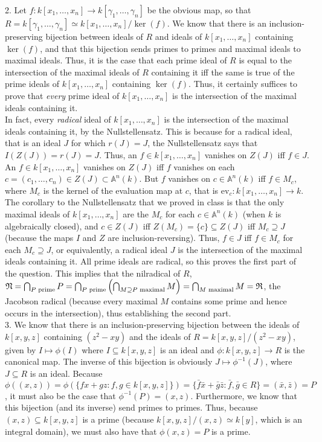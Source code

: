 \documentclass[11pt]{article}
\begin{document}
\num{2.} Let $f:k[x_1,\ldots,x_n]\rightarrow k[\gamma_1,\ldots,\gamma_n]$
be the obvious map, so that $R=k[\gamma_1,\ldots,\gamma_n]\simeq
k[x_1,\ldots,x_n]/\ker(f)$. We know that there is an inclusion-preserving
bijection between ideals of $R$ and ideals of $k[x_1,\ldots,x_n]$ containing
$\ker(f)$, and that this bijection sends primes to primes and maximal
ideals to maximal ideals. Thus, it is the case that each prime ideal of $R$
is equal to the intersection of the maximal ideals of $R$ containing it
iff the same is true of the prime ideals of $k[x_1,\ldots,x_n]$ containing
$\ker(f)$. Thus, it certainly suffices to prove that \textit{every} prime
ideal of $k[x_1,\ldots,x_n]$ is the intersection of the maximal ideals
containing it.\\

In fact, every \textit{radical} ideal of $k[x_1,\ldots,x_n]$
is the intersection of the maximal ideals containing it, by the
Nullstellensatz. This is because for a radical ideal, that is an ideal $J$ for
which $r(J)=J$, the Nullstellensatz says that $I(Z(J))=r(J)=J$. Thus, an $f\in
k[x_1,\ldots,x_n]$ vanishes on $Z(J)$ iff $f\in J$. An $f\in k[x_1,\ldots,x_n]$
vanishes on $Z(J)$ iff $f$ vanishes on each $c=(c_1,\ldots,c_n)\in
Z(J)\subset\mathbb{A}^n(k)$. But $f$ vanishes on $c\in\mathbb{A}^n(k)$
iff $f\in M_c$, where $M_c$ is the kernel of the evaluation map at $c$,
that is $\text{ev}_c:k[x_1,\ldots,x_n]\rightarrow k$. The corollary to the
Nullstellensatz that we proved in class is that the only maximal ideals of
$k[x_1,\ldots,x_n]$ are the $M_c$ for each $c\in\mathbb{A}^n(k)$ (when $k$
is algebraically closed), and $c\in Z(J)$ iff $Z(M_c)=\{c\}\subseteq Z(J)$ iff
$M_c\supseteq J$ (because the maps $I$ and $Z$ are inclusion-reversing). Thus,
$f\in J$ iff $f\in M_c$ for each $M_c\supseteq J$, or equivalently, a radical
ideal $J$ is the intersection of the maximal ideals containing it. All prime
ideals are radical, so this proves the first part of the question. This
implies that the nilradical of $R$, $\frak{N}=\bigcap_{P\text{ prime}}
P=\bigcap_{P\text{ prime}}\left(\bigcap_{M\supseteq P\text{ maximal}}
M\right)= \bigcap_{M\text{ maximal}} M=\frak{R}$, the Jacobson radical
(because every maximal $M$ contains some prime and hence occurs in the
intersection), thus establishing the second part.\\

\num{3.} We know that there is an inclusion-preserving bijection
between the ideals of $k[x,y,z]$ containing $(z^2-xy)$ and the ideals
of $R=k[x,y,z]/(z^2-xy)$, given by $I\mapsto \phi(I)$ where $I\subseteq
k[x,y,z]$ is an ideal and $\phi:k[x,y,z]\rightarrow R$ is the canonical
map. The inverse of this bijection is obviously $J\mapsto\phi^{-1}(J)$,
where $J\subseteq R$ is an ideal. Because $\phi((x,z))=\phi(\{fx+gz:f,g\in
k[x,y,z]\})=\{\bar{f}\bar{x}+\bar{g}\bar{z}:\bar{f},\bar{g}\in
R\}=(\bar{x},\bar{z})=P$, it must also be the case that
$\phi^{-1}(P)=(x,z)$. Furthermore, we know that this bijection (and its
inverse) send primes to primes. Thus, because $(x,z)\subseteq k[x,y,z]$ is
a prime (because $k[x,y,z]/(x,z)\simeq k[y]$, which is an integral domain),
we must also have that $\phi(x,z)=P$ is a prime. \\
\end{document}
